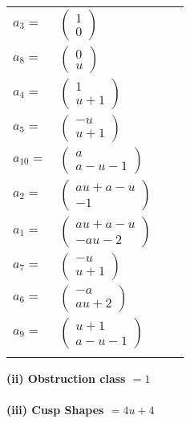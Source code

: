\documentclass[1p]{elsarticle_modified}
\theoremstyle{definition}
\begin{document}
\begin{tabular}{m{7pt} m{180pt} m{7pt} m{180pt} }
\flushright $a_{3}=$&$\begin{pmatrix}1\\0\end{pmatrix}$ \\
\flushright $a_{8}=$&$\begin{pmatrix}0\\u\end{pmatrix}$ \\
\flushright $a_{4}=$&$\begin{pmatrix}1\\u+1\end{pmatrix}$ \\
\flushright $a_{5}=$&$\begin{pmatrix}- u\\u+1\end{pmatrix}$ \\
\flushright $a_{10}=$&$\begin{pmatrix}a\\a- u-1\end{pmatrix}$ \\
\flushright $a_{2}=$&$\begin{pmatrix}a u+a- u\\-1\end{pmatrix}$ \\
\flushright $a_{1}=$&$\begin{pmatrix}a u+a- u\\- a u-2\end{pmatrix}$ \\
\flushright $a_{7}=$&$\begin{pmatrix}- u\\u+1\end{pmatrix}$ \\
\flushright $a_{6}=$&$\begin{pmatrix}- a\\a u+2\end{pmatrix}$ \\
\flushright $a_{9}=$&$\begin{pmatrix}u+1\\a- u-1\end{pmatrix}$\\&\end{tabular}
\flushleft \textbf{(ii) Obstruction class $= 1$}\\~\\
\flushleft \textbf{(iii) Cusp Shapes $= 4 u+4$}\\~\\
\end{document}
